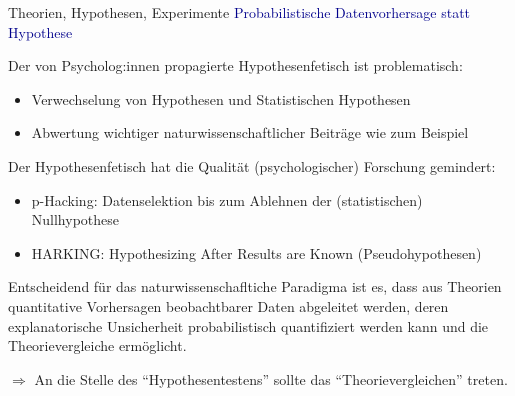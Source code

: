 \documentclass[
  8pt,
  ignorenonframetext,
]{beamer}
\providecommand{\tightlist}{%
  \setlength{\itemsep}{0pt}\setlength{\parskip}{0pt}}
\begin{document}
\begin{frame}{Theorien, Hypothesen, Experimente}
\protect\hypertarget{theorien-hypothesen-experimente-4}{}
\textcolor{darkblue}{Probabilistische Datenvorhersage statt Hypothese}
\small {}

Der von Psycholog:innen propagierte Hypothesenfetisch ist problematisch:

\begin{itemize}
\item Verwechselung von Hypothesen und Statistischen Hypothesen
\item Abwertung wichtiger naturwissenschaftlicher Beiträge wie zum Beispiel
\begin{itemize}
\end{itemize}
\end{itemize}

Der Hypothesenfetisch hat die Qualität (psychologischer) Forschung
gemindert:

\begin{itemize}
\tightlist
\item
  p-Hacking: Datenselektion bis zum Ablehnen der (statistischen)
  Nullhypothese
\item
  HARKING: Hypothesizing After Results are Known (Pseudohypothesen)
\end{itemize}

Entscheidend für das naturwissenschafltiche Paradigma ist es, dass aus
Theorien quantitative Vorhersagen beobachtbarer Daten abgeleitet werden,
deren explanatorische Unsicherheit probabilistisch quantifiziert werden
kann und die Theorievergleiche ermöglicht.

\(\Rightarrow\) An die Stelle des ``Hypothesentestens'' sollte das
``Theorievergleichen'' treten.
\end{frame}
\end{document}
